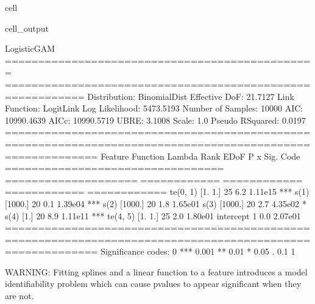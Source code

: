 \documentclass[letterpaper,10pt,english]{jupyterBook}
\begin{document}
\begin{sphinxuseclass}{cell}
\begin{sphinxVerbatimOutput}
\begin{sphinxuseclass}{cell_output}
\begin{sphinxVerbatim}[commandchars=\\\{\}]
LogisticGAM                                                                                               
=============================================== ==========================================================
Distribution:                      BinomialDist Effective DoF:                                     21.7127
Link Function:                        LogitLink Log Likelihood:                                 \PYGZhy{}5473.5193
Number of Samples:                        10000 AIC:                                            10990.4639
                                                AICc:                                           10990.5719
                                                UBRE:                                               3.1008
                                                Scale:                                                 1.0
                                                Pseudo R\PYGZhy{}Squared:                                   0.0197
==========================================================================================================
Feature Function                  Lambda               Rank         EDoF         P \PYGZgt{} x        Sig. Code   
================================= ==================== ============ ============ ============ ============
te(0, 1)                          [1. 1.]              25           6.2          1.11e\PYGZhy{}15     ***         
s(1)                              [1000.]              20           0.1          1.39e\PYGZhy{}04     ***         
s(2)                              [1000.]              20           1.8          1.65e\PYGZhy{}01                 
s(3)                              [1000.]              20           2.7          4.35e\PYGZhy{}02     *           
s(4)                              [1.]                 20           8.9          1.11e\PYGZhy{}11     ***         
te(4, 5)                          [1. 1.]              25           2.0          1.80e\PYGZhy{}01                 
intercept                                              1            0.0          2.07e\PYGZhy{}01                 
==========================================================================================================
Significance codes:  0 \PYGZsq{}***\PYGZsq{} 0.001 \PYGZsq{}**\PYGZsq{} 0.01 \PYGZsq{}*\PYGZsq{} 0.05 \PYGZsq{}.\PYGZsq{} 0.1 \PYGZsq{} \PYGZsq{} 1

WARNING: Fitting splines and a linear function to a feature introduces a model identifiability problem
         which can cause p\PYGZhy{}values to appear significant when they are not.


\end{sphinxVerbatim}
\end{sphinxuseclass}
\end{sphinxVerbatimOutput}
\end{sphinxuseclass}
\end{document}
